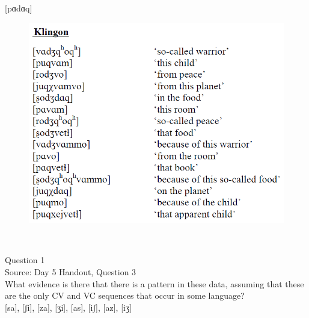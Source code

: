 \documentclass[12pt]{article}
\begin{document}
{[pɑdɑq]}

\begin{figure}[H]
\includegraphics{../images/klingon.png}
\end{figure}

\newpage

\begin{center}
\textbf{{\color{red}{\HUGE END OF EXAM}}}\\

\end{center}
\newpage

\begin{center}
\textbf{{\color{blue}{\HUGE START OF EXAM\\}}}

\textbf{{\color{blue}{\HUGE Student ID: 9376\\}}}

\textbf{{\color{blue}{\HUGE 4:30 - 4:45 PM\\}}}

\end{center}
\newpage

{\large Question 1}\\

Source: Day 5 Handout, Question 3\\

What evidence is there that there is a pattern in these data, assuming that these are the only CV and VC sequences that occur in some language?\\

{[sa]}, {[ʃi]}, {[za]}, {[ʒi]}, {[as]}, {[iʃ]}, {[az]}, {[iʒ]}
\end{document}

